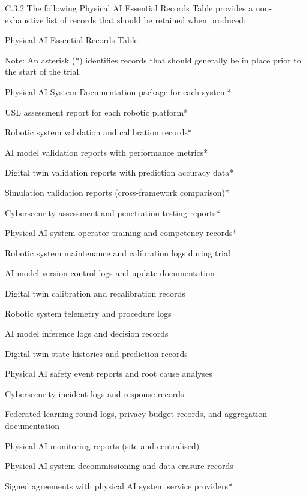 C.3.2 The following Physical AI Essential Records Table provides a non-exhaustive list of records that should be retained when produced:

Physical AI Essential Records Table

Note: An asterisk (*) identifies records that should generally be in place prior to the start of the trial.

\begin{description}[leftmargin=0.5cm,style=sameline]

\item[--] Physical AI System Documentation package for each system*
\item[--] USL assessment report for each robotic platform*
\item[--] Robotic system validation and calibration records*
\item[--] AI model validation reports with performance metrics*
\item[--] Digital twin validation reports with prediction accuracy data*
\item[--] Simulation validation reports (cross-framework comparison)*
\item[--] Cybersecurity assessment and penetration testing reports*
\item[--] Physical AI system operator training and competency records*
\item[--] Robotic system maintenance and calibration logs during trial
\item[--] AI model version control logs and update documentation
\item[--] Digital twin calibration and recalibration records
\item[--] Robotic system telemetry and procedure logs
\item[--] AI model inference logs and decision records
\item[--] Digital twin state histories and prediction records
\item[--] Physical AI safety event reports and root cause analyses
\item[--] Cybersecurity incident logs and response records
\item[--] Federated learning round logs, privacy budget records, and aggregation documentation
\item[--] Physical AI monitoring reports (site and centralised)
\item[--] Physical AI system decommissioning and data erasure records
\item[--] Signed agreements with physical AI system service providers*

\end{description}

